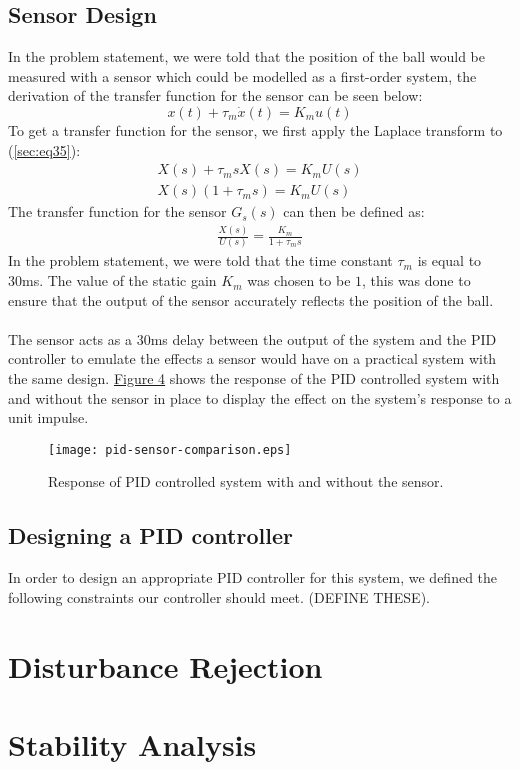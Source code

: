 \documentclass[a4paper,10pt,reqno]{amsart}
\numberwithin{equation}{section}
\begin{document}
\subsection{Sensor Design}In the problem statement, we were told that the position of the ball would be measured with a sensor which could be modelled as a first-order system, the derivation of the transfer function for the sensor can be seen below: 
\begin{equation}
\label{sec:eq35}
    x(t)+\tau_m\dot x(t)=K_mu(t)
\end{equation}
To get a transfer function for the sensor, we first apply the Laplace transform to (\ref{sec:eq35}):
\begin{align*}
    X(s)+\tau_msX(s)=K_mU(s) \\
    X(s)(1+\tau_ms)=K_mU(s)
\end{align*}
The transfer function for the sensor $G_s(s)$ can then be defined as:
\begin{align}
    \frac{X(s)}{U(s)}=\frac{K_m}{1+\tau_ms}
\end{align}
In the problem statement, we were told that the time constant $\tau_m$ is equal to 30ms. The value of the static gain $K_m$ was chosen to be $1$, this was done to ensure that the output of the sensor accurately reflects the position of the ball. \\ \\
The sensor acts as a 30ms delay between the output of the system and the PID controller to emulate the effects a sensor would have on a practical system with the same design. \hyperref[fig:sensorcomparison]{Figure 4} shows the response of the PID controlled system with and without the sensor in place to display the effect on the system's response to a unit impulse.
\begin{figure}[h]
\centering
\texttt{[image: pid-sensor-comparison.eps]}
\caption{Response of PID controlled system with and without the sensor.}
\label{fig:sensorcomparison}
\end{figure}
\subsection{Designing a PID controller} In order to design an appropriate PID controller for this system, we defined the following constraints our controller should meet. (DEFINE THESE).
\section{Disturbance Rejection}
\section{Stability Analysis} 
\end{document}
